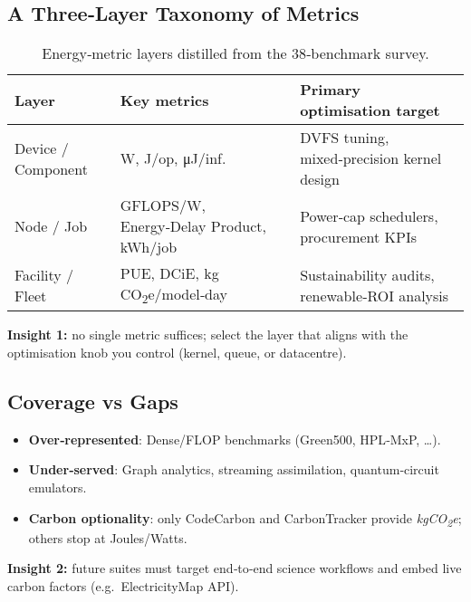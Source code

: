 \subsection{A Three‑Layer Taxonomy of Metrics}


\begin{table}[ht]
  \centering
  \caption{Energy‑metric layers distilled from the 38‑benchmark survey.}
  \label{tab:metric_layers}
  \footnotesize
  \renewcommand{\arraystretch}{1.05}
  \setlength{\tabcolsep}{3pt}
  \begin{tabularx}{\columnwidth}{@{} l X X @{}}
    \toprule
    \textbf{Layer} & \textbf{Key metrics} & \textbf{Primary optimisation target} \\ \midrule
    Device / Component & W, J/op, \si{\micro\joule}/inf. & DVFS tuning, mixed‑precision kernel design \\ 
    Node / Job        & GFLOPS/W, Energy‑Delay Product, kWh/job & Power‑cap schedulers, procurement KPIs \\ 
    Facility / Fleet  & PUE, DCiE, kg CO\textsubscript{2}e/model‑day & Sustainability audits, renewable‑ROI analysis \\ \bottomrule
  \end{tabularx}
\end{table}

\textbf{Insight 1:} no single metric suffices; select the layer that aligns
with the optimisation knob you control (kernel, queue, or datacentre).

\subsection{Coverage vs Gaps}

\begin{itemize}
  \item \textbf{Over‑represented}: Dense/FLOP benchmarks (Green500, HPL‑MxP, \dots).
  \item \textbf{Under‑served}: Graph analytics, streaming assimilation, quantum‑circuit emulators.
  \item \textbf{Carbon optionality}: only CodeCarbon and CarbonTracker provide \textit{kgCO\textsubscript{2}e}; others stop at Joules/Watts.
\end{itemize}

\textbf{Insight 2:} future suites must target end‑to‑end science workflows and
embed live carbon factors (e.g.\ ElectricityMap API).

